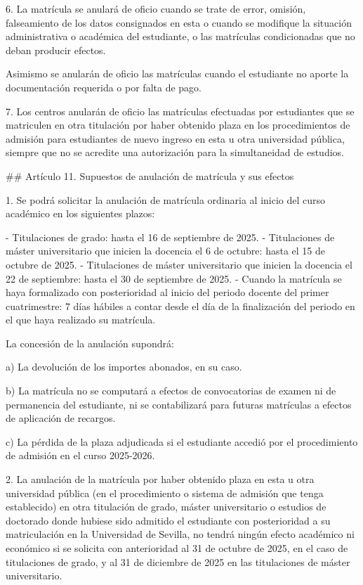 \documentclass{article}
\begin{document}
\begin{itemize}
\begin{itemize}
\begin{scriptsize}
                  6. La matrícula se anulará de oficio cuando se trate de error, omisión, falseamiento de los datos consignados en esta o cuando se modifique la situación administrativa o académica del estudiante, o las matrículas condicionadas que no deban producir efectos.

                  Asimismo se anularán de oficio las matrículas cuando el estudiante no aporte la documentación requerida o por falta de pago.

                  7. Los centros anularán de oficio las matrículas efectuadas por estudiantes que se matriculen en otra titulación por haber obtenido plaza en los procedimientos de admisión para estudiantes de nuevo ingreso en esta u otra universidad pública, siempre que no se acredite una autorización para la simultaneidad de estudios.

                  \#\# Artículo 11. Supuestos de anulación de matrícula y sus efectos

                  1. Se podrá solicitar la anulación de matrícula ordinaria al inicio del curso académico en los siguientes plazos:

                  - Titulaciones de grado: hasta el 16 de septiembre de 2025.
                  - Titulaciones de máster universitario que inicien la docencia el 6 de octubre: hasta el 15 de octubre de 2025.
                  - Titulaciones de máster universitario que inicien la docencia el 22 de septiembre: hasta el 30 de septiembre de 2025.
                  - Cuando la matrícula se haya formalizado con posterioridad al inicio del periodo docente del primer cuatrimestre: 7 días hábiles a contar desde el día de la finalización del periodo en el que haya realizado su matrícula.

                  La concesión de la anulación supondrá:

                  a) La devolución de los importes abonados, en su caso.

                  b) La matrícula no se computará a efectos de convocatorias de examen ni de permanencia del estudiante, ni se contabilizará para futuras matrículas a efectos de aplicación de recargos.

                  c) La pérdida de la plaza adjudicada si el estudiante accedió por el procedimiento de admisión en el curso 2025-2026.

                  2. La anulación de la matrícula por haber obtenido plaza en esta u otra universidad pública (en el procedimiento o sistema de admisión que tenga establecido) en otra titulación de grado, máster universitario o estudios de doctorado donde hubiese sido admitido el estudiante con posterioridad a su matriculación en la Universidad de Sevilla, no tendrá ningún efecto académico ni económico si se solicita con anterioridad al 31 de octubre de 2025, en el caso de titulaciones de grado, y al 31 de diciembre de 2025 en las titulaciones de máster universitario.


\end{scriptsize}
\end{itemize}
\end{itemize}
\end{document}

